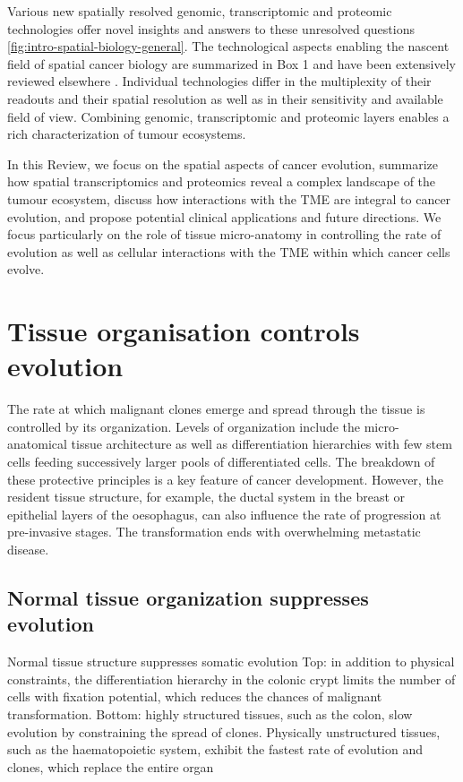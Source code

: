 Various new spatially resolved genomic, transcriptomic and proteomic technologies offer novel insights and answers to these unresolved questions \cref{fig:intro-spatial-biology-general}. The technological aspects enabling the nascent field of spatial cancer biology are summarized in Box 1 and have been extensively reviewed elsewhere \parencite{Lewis2021-ic}. Individual technologies differ in the multiplexity of their readouts and their spatial resolution as well as in their sensitivity and available field of view. Combining genomic, transcriptomic and proteomic layers enables a rich characterization of tumour ecosystems.

In this Review, we focus on the spatial aspects of cancer evolution, summarize how spatial transcriptomics and proteomics reveal a complex landscape of the tumour ecosystem, discuss how interactions with the \ac{TME} are integral to cancer evolution, and propose potential clinical applications and future directions. We focus particularly on the role of tissue micro-anatomy in controlling the rate of evolution as well as cellular interactions with the \ac{TME} within which cancer cells evolve.

\section{Tissue organisation controls evolution}

The rate at which malignant clones emerge and spread through the tissue is controlled by its organization. Levels of organization include the micro-anatomical tissue architecture as well as differentiation hierarchies with few stem cells feeding successively larger pools of differentiated cells. The breakdown of these protective principles is a key feature of cancer development. However, the resident tissue structure, for example, the ductal system in the breast or epithelial layers of the oesophagus, can also influence the rate of progression at pre-invasive stages. The transformation ends with overwhelming metastatic disease.

\subsection*{Normal tissue organization suppresses evolution}

    {Normal tissue structure suppresses somatic evolution \parencite{Seferbekova2023-wg}}
    {Top: in addition to physical constraints, the differentiation hierarchy in the colonic crypt limits the number of cells with fixation potential, which reduces the chances of malignant transformation. Bottom: highly structured tissues, such as the colon, slow evolution by constraining the spread of clones. Physically unstructured tissues, such as the haematopoietic system, exhibit the fastest rate of evolution and clones, which replace the entire organ}

